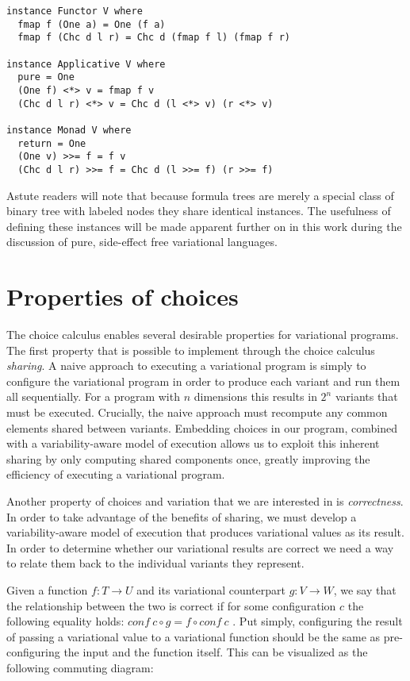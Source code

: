 \documentclass[onehalf,11pt]{beavtex}
\begin{document}
\begin{lstlisting}
instance Functor V where
  fmap f (One a) = One (f a)
  fmap f (Chc d l r) = Chc d (fmap f l) (fmap f r)
  
instance Applicative V where
  pure = One
  (One f) <*> v = fmap f v
  (Chc d l r) <*> v = Chc d (l <*> v) (r <*> v)
  
instance Monad V where
  return = One
  (One v) >>= f = f v
  (Chc d l r) >>= f = Chc d (l >>= f) (r >>= f)
\end{lstlisting}

Astute readers will note that because formula trees are merely a special class of binary tree with
labeled nodes they share identical instances. The usefulness of defining these instances will be made
apparent further on in this work during the discussion of pure, side-effect free variational languages.

\section{Properties of choices}

The choice calculus enables several desirable properties for variational programs.
The first property that is possible to implement through the choice calculus \emph{sharing}. A naive approach to executing a variational program is simply to
configure the variational program in order to produce each variant and run them all sequentially.
For a program with $n$ dimensions this results in $2^n$ variants that must be executed. Crucially,
the naive approach must recompute any common elements shared between variants. Embedding
choices in our program, combined with a variability-aware model of execution allows us to exploit this
inherent sharing by only computing shared components once, greatly improving the efficiency of
executing a variational program.

Another property of choices and variation that we are interested in is \emph{correctness}. In order
to take advantage of the benefits of sharing, we must develop a variability-aware model of execution
that produces variational values as its result. In order to determine whether our variational results
are correct we need a way to relate them back to the individual variants they represent.

Given a function $f : T \rightarrow U$ and its variational counterpart $g : V \rightarrow W$, we say that
the relationship between the two is correct if for some configuration $c$ the following equality holds:
$\mathit{conf}\ c \circ g = f \circ \mathit{conf}\ c$ \cite{hubbard2016formula}. Put simply, configuring the result
of passing a variational value to a variational function should be the same as pre-configuring the input
and the function itself. This can be visualized as the following commuting diagram:
\end{document}
